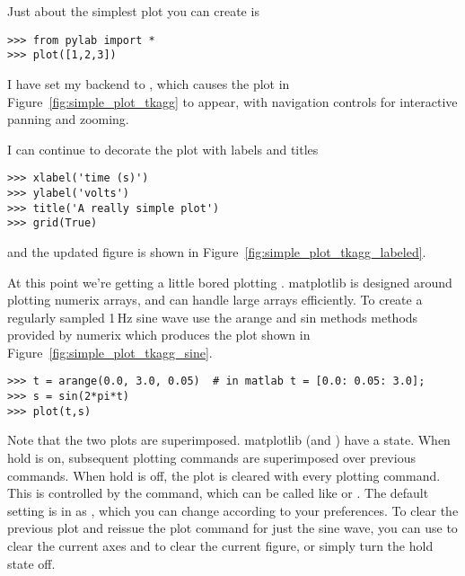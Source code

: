\documentclass[twoside]{book}
\begin{document}
Just about the simplest plot you can create is

\begin{lstlisting}
>>> from pylab import *
>>> plot([1,2,3])
\end{lstlisting}

\noindent I have set my backend to , which causes
the plot in Figure~\ref{fig:simple_plot_tkagg} to appear, with
navigation controls for interactive panning and zooming.


I can continue to decorate the plot with labels and titles

\begin{lstlisting}
>>> xlabel('time (s)')
>>> ylabel('volts')
>>> title('A really simple plot')
>>> grid(True)
\end{lstlisting}

\noindent and the updated figure is shown in Figure~\ref{fig:simple_plot_tkagg_labeled}.


At this point we're getting a little bored plotting \code{[1,2,3]}.
matplotlib is designed around plotting numerix arrays, and can handle
large arrays efficiently.  To create a regularly sampled 1\,Hz sine
wave use the arange and sin methods methods provided by numerix which
produces the plot shown in Figure~\ref{fig:simple_plot_tkagg_sine}.

\begin{lstlisting}
>>> t = arange(0.0, 3.0, 0.05)  # in matlab t = [0.0: 0.05: 3.0];
>>> s = sin(2*pi*t)
>>> plot(t,s)
\end{lstlisting}


\noindent Note that the two plots are superimposed.  matplotlib (and
\matlab) have a  state.  When hold is on, subsequent
plotting commands are superimposed over previous commands.  When hold
is off, the plot is cleared with every plotting command.  This is
controlled by the  command, which can be called like
 or .  The default setting is in
 as , which you can change
according to your preferences.  To clear the previous plot and reissue
the plot command for just the sine wave, you can use  to
clear the current axes and  to clear the current figure, or
simply turn the hold state off.
\end{document}
